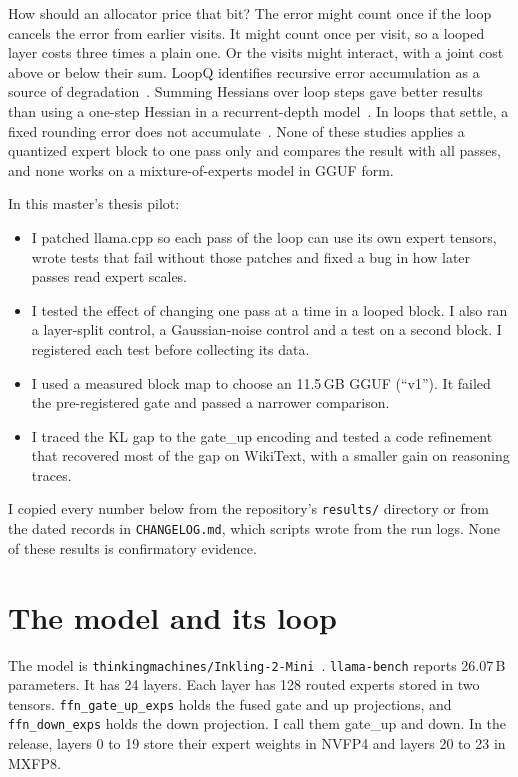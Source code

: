 \documentclass[11pt,a4paper]{article}
\newcommand{\code}[1]{\texttt{#1}}
\begin{document}
How should an allocator price that bit? The error might count once if the loop cancels the error from earlier visits. It might count once per visit, so a looped layer costs three times a plain one. Or the visits might interact, with a joint cost above or below their sum. LoopQ identifies recursive error accumulation as a source of degradation~\citep{loopq}. Summing Hessians over loop steps gave better results than using a one-step Hessian in a recurrent-depth model~\citep{feedback}. In loops that settle, a fixed rounding error does not accumulate~\citep{tiltedbowl}. None of these studies applies a quantized expert block to one pass only and compares the result with all passes, and none works on a mixture-of-experts model in GGUF form.

In this master's thesis pilot:
\begin{itemize}
\item I patched llama.cpp so each pass of the loop can use its own expert tensors, wrote tests that fail without those patches and fixed a bug in how later passes read expert scales.
\item I tested the effect of changing one pass at a time in a looped block. I also ran a layer-split control, a Gaussian-noise control and a test on a second block. I registered each test before collecting its data.
\item I used a measured block map to choose an 11.5\,GB GGUF (``v1''). It failed the pre-registered gate and passed a narrower comparison.
\item I traced the KL gap to the gate\_up encoding and tested a code refinement that recovered most of the gap on WikiText, with a smaller gain on reasoning traces.
\end{itemize}

I copied every number below from the repository's \code{results/} directory or from the dated records in \code{CHANGELOG.md}, which scripts wrote from the run logs. None of these results is confirmatory evidence.

\section{The model and its loop}

The model is \code{thinkingmachines/Inkling-2-Mini}~\citep{inkling}. \code{llama-bench} reports 26.07\,B parameters. It has 24 layers. Each layer has 128 routed experts stored in two tensors. \code{ffn\_gate\_up\_exps} holds the fused gate and up projections, and \code{ffn\_down\_exps} holds the down projection. I call them gate\_up and down. In the release, layers 0 to 19 store their expert weights in NVFP4 and layers 20 to 23 in MXFP8.
\end{document}
